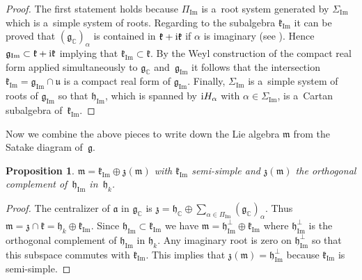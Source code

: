 \documentclass[pdftex]{sigma}
\numberwithin{equation}{section}
\newtheorem{Proposition}[Theorem]{Proposition}
 { \theoremstyle{definition}
\newtheorem{Definition}[Theorem]{Definition}
\newtheorem{Note}[Theorem]{Note}
\newtheorem{Example}[Theorem]{Example}
\newtheorem{Remark}[Theorem]{Remark} }
\newcommand{\func}[1]{\operatorname{#1}}
\begin{document}
\begin{proof}The first statement holds because $\Pi _{\func{Im}}$ is a~root system generated by $\Sigma _{\func{Im}}$ which is a~simple system of roots. Regarding to the subalgebra $\mathfrak{k}_{\func{Im}}$ it can be proved that $( \mathfrak{g}_{\mathbb{C}}) _{\alpha }$ is contained in $\mathfrak{k}+{\rm i}\mathfrak{k}$ if $\alpha $ is imaginary (see \cite[Lemma~14.6]{alglie}). Hence $\mathfrak{g}_{\func{Im}}\subset \mathfrak{k}+{\rm i}\mathfrak{k}$ implying that $\mathfrak{k}_{\func{Im}}\subset \mathfrak{k}$. By the Weyl construction of the compact real form applied simultaneously to $\mathfrak{g}_{\mathbb{C}} $ and~$\mathfrak{g}_{\func{Im}}$ it follows that the
intersection $\mathfrak{k}_{\func{Im}}=\mathfrak{g}_{\func{Im}}\cap \mathfrak{u}$ is a compact real form of $\mathfrak{g}_{\func{Im}}$. Finally, $\Sigma _{\func{Im}}$ is a~simple system of roots of $\mathfrak{g}_{\func{Im}}$ so that $\mathfrak{h}_{\func{Im}}$, which is spanned by ${\rm i}H_{\alpha }$ with $\alpha \in \Sigma _{\func{Im}}$, is a~Cartan subalgebra of~$\mathfrak{k}_{\func{Im}}$.
\end{proof}

Now we combine the above pieces to write down the Lie algebra $\mathfrak{m}$ from the Satake diagram of~$\mathfrak{g}$.

\begin{Proposition}\label{propSpanCenterm}$\mathfrak{m}=\mathfrak{k}_{\func{Im}}\oplus \mathfrak{z}(\mathfrak{m}) $ with $\mathfrak{k}_{\func{Im}}$ semi-simple and $\mathfrak{z}(\mathfrak{m}) $ the orthogonal complement of~$\mathfrak{h}_{\func{Im}}$ in~$\mathfrak{h}_{k}$.
\end{Proposition}

\begin{proof}The centralizer of $\mathfrak{a}$ in $\mathfrak{g}_{\mathbb{C}}$ is $\mathfrak{z}=\mathfrak{h}_{\mathbb{C}}\oplus \sum\limits_{\alpha \in \Pi _{\func{Im}}} ( \mathfrak{g}_{\mathbb{C}} ) _{\alpha }$. Thus $\mathfrak{m}=\mathfrak{z}\cap \mathfrak{k}=\mathfrak{h}_{k}\oplus \mathfrak{k}_{\func{Im}} $. Since $\mathfrak{h}_{\func{Im}}\subset \mathfrak{k}_{\func{Im}}$ we have $\mathfrak{m}=\mathfrak{h}_{\func{Im}}^{\bot }\oplus \mathfrak{k}_{\func{Im}}$ where $\mathfrak{h}_{\func{Im}}^{\bot }$ is the orthogonal complement of $\mathfrak{h}_{\func{Im}}$ in $\mathfrak{h}_{k}$. Any imaginary root is zero on $\mathfrak{h}_{\func{Im}}^{\bot }$ so that this subspace commutes with $\mathfrak{k}_{\func{Im}}$. This implies that $\mathfrak{z}(\mathfrak{m}) =\mathfrak{h}_{\func{Im}}^{\bot }$ because $\mathfrak{k}_{\func{Im}}$ is semi-simple.
\end{proof}
\end{document}
